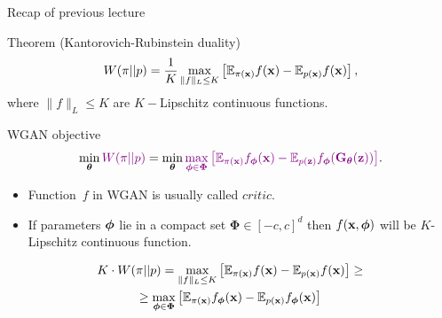 

\begin{frame}
\titlepage
\end{frame}
\begin{frame}{Recap of previous lecture}
	\begin{block}{Theorem (Kantorovich-Rubinstein duality)}
		\vspace{-0.2cm}
		\[
		W(\pi || p) = \frac{1}{K} \max_{\| f \|_L \leq K} \left[ \mathbb{E}_{\pi(\mathbf{x})} f(\mathbf{x})  - \mathbb{E}_{p(\mathbf{x})} f(\mathbf{x})\right],
		\]
		where $\| f \|_L \leq K$ are $K-$Lipschitz continuous functions.
	\end{block}
	\begin{block}{WGAN objective}
		\vspace{-0.3cm}
		\[
		\min_{\boldsymbol{\theta}} {\color{violet}W(\pi || p)} = \min_{\boldsymbol{\theta}} {\color{violet}\max_{\boldsymbol{\phi} \in \boldsymbol{\Phi}} \left[ \mathbb{E}_{\pi(\mathbf{x})} f_{\boldsymbol{\phi}}(\mathbf{x})  - \mathbb{E}_{p(\mathbf{z})} f_{\boldsymbol{\phi}}(\mathbf{G}_{\boldsymbol{\theta}}(\mathbf{z}))\right]}.
		\]
		\vspace{-0.3cm}
	\end{block}
	\begin{itemize}
		\item Function~$f$ in WGAN is usually called $\textit{critic}$.
		\item If parameters $\boldsymbol{\phi}$ lie in a compact set $\boldsymbol{\Phi} \in [-c, c]^d$ then $f(\mathbf{x}, \boldsymbol{\phi})$ will be $K$-Lipschitz continuous function. 
	\end{itemize}
	\begin{multline*}
		K \cdot W(\pi || p) = \max_{\| f \|_L \leq K} \left[ \mathbb{E}_{\pi(\mathbf{x})} f(\mathbf{x})  - \mathbb{E}_{p(\mathbf{x})} f(\mathbf{x})\right] \geq \\  \geq \max_{\boldsymbol{\phi} \in \boldsymbol{\Phi}} \left[ \mathbb{E}_{\pi(\mathbf{x})} f_{\boldsymbol{\phi}}(\mathbf{x})  - \mathbb{E}_{p(\mathbf{x})} f_{\boldsymbol{\phi}}(\mathbf{x})\right]
	\end{multline*}
\end{frame}
